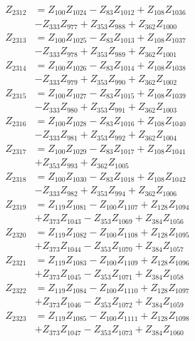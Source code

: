 \begin{multicols}{2}
\begin{align}
Z_{2312} &= Z_{100}Z_{1024} - Z_{83}Z_{1012} + Z_{108}Z_{1036}  \nonumber \\
&- Z_{333}Z_{977} + Z_{353}Z_{988} + Z_{362}Z_{1000} \nonumber \\
Z_{2313} &= Z_{100}Z_{1025} - Z_{83}Z_{1013} + Z_{108}Z_{1037}  \nonumber \\
&- Z_{333}Z_{978} + Z_{353}Z_{989} + Z_{362}Z_{1001} \nonumber \\
Z_{2314} &= Z_{100}Z_{1026} - Z_{83}Z_{1014} + Z_{108}Z_{1038}  \nonumber \\
&- Z_{333}Z_{979} + Z_{353}Z_{990} + Z_{362}Z_{1002} \nonumber \\
Z_{2315} &= Z_{100}Z_{1027} - Z_{83}Z_{1015} + Z_{108}Z_{1039}  \nonumber \\
&- Z_{333}Z_{980} + Z_{353}Z_{991} + Z_{362}Z_{1003} \nonumber \\
Z_{2316} &= Z_{100}Z_{1028} - Z_{83}Z_{1016} + Z_{108}Z_{1040}  \nonumber \\
&- Z_{333}Z_{981} + Z_{353}Z_{992} + Z_{362}Z_{1004} \nonumber \\
Z_{2317} &= Z_{100}Z_{1029} - Z_{83}Z_{1017} + Z_{108}Z_{1041}  \nonumber \\
&+ Z_{353}Z_{993} + Z_{362}Z_{1005} \nonumber \\
Z_{2318} &= Z_{100}Z_{1030} - Z_{83}Z_{1018} + Z_{108}Z_{1042}  \nonumber \\
&- Z_{333}Z_{982} + Z_{353}Z_{994} + Z_{362}Z_{1006} \nonumber \\
Z_{2319} &= Z_{119}Z_{1081} - Z_{100}Z_{1107} + Z_{128}Z_{1094}  \nonumber \\
&+ Z_{373}Z_{1043} - Z_{353}Z_{1069} + Z_{384}Z_{1056} \nonumber \\
Z_{2320} &= Z_{119}Z_{1082} - Z_{100}Z_{1108} + Z_{128}Z_{1095}  \nonumber \\
&+ Z_{373}Z_{1044} - Z_{353}Z_{1070} + Z_{384}Z_{1057} \nonumber \\
Z_{2321} &= Z_{119}Z_{1083} - Z_{100}Z_{1109} + Z_{128}Z_{1096}  \nonumber \\
&+ Z_{373}Z_{1045} - Z_{353}Z_{1071} + Z_{384}Z_{1058} \nonumber \\
Z_{2322} &= Z_{119}Z_{1084} - Z_{100}Z_{1110} + Z_{128}Z_{1097}  \nonumber \\
&+ Z_{373}Z_{1046} - Z_{353}Z_{1072} + Z_{384}Z_{1059} \nonumber \\
Z_{2323} &= Z_{119}Z_{1085} - Z_{100}Z_{1111} + Z_{128}Z_{1098}  \nonumber \\
&+ Z_{373}Z_{1047} - Z_{353}Z_{1073} + Z_{384}Z_{1060} \nonumber \\

\end{align}
\end{multicols}
